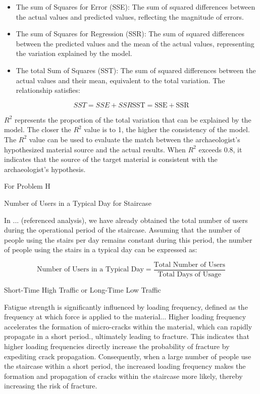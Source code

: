 \documentclass{mcmthesis}
\begin{document}
\begin{itemize} 

\item The sum of Squares for Error (SSE): The sum of squared differences between the actual values and predicted values, reflecting the magnitude of errors. 

\item The sum of Squares for Regression (SSR): The sum of squared differences between the predicted values and the mean of the actual values, representing the variation explained by the model. 

\item The total Sum of Squares (SST): The sum of squared differences between the actual values and their mean, equivalent to the total variation. The relationship satisfies: 
\end{itemize}



\[SST=SSE+SSR\text{SST} = \text{SSE} + \text{SSR}\]

$R^2$ represents the proportion of the total variation that can be explained by the model. The closer the $R^2$ value is to 1, the higher the consistency of the model. The $R^2$ value can be used to evaluate the match between the archaeologist's hypothesized material source and the actual results. When $R^2$ exceeds 0.8, it indicates that the source of the target material is consistent with the archaeologist's hypothesis.


For Problem H


Number of Users in a Typical Day for Staircase 


In ... (referenced analysis), we have already obtained the total number of users during the operational period of the staircase. Assuming that the number of people using the stairs per day remains constant during this period, the number of people using the stairs in a typical day can be expressed as:

\[\text{Number of Users in a Typical Day} = \frac{\text{Total Number of Users}}{\text{Total Days of Usage}}\]

Short-Time High Traffic or Long-Time Low Traffic


Fatigue strength is significantly influenced by loading frequency, defined as the frequency at which force is applied to the
material\cite{Yokobori1976}.\cite{Takezono1980}.\cite{HeimbachHeimbach+1970+377+380}. Higher loading frequency accelerates the formation of micro-cracks within the material, which can rapidly propagate in a short
period\cite{ SJESAC88A958454EEE1CD4ED092FB8A0E8F8}.\cite{ SJESF46245B4D88236414B6977C781CEC048}, ultimately leading to fracture. This indicates that higher loading frequencies directly increase the probability of fracture by expediting crack propagation. Consequently, when a large number of people use the staircase within a short period, the increased loading frequency makes the formation and propagation of cracks within the staircase more likely, thereby increasing the risk of fracture.
\end{document}
